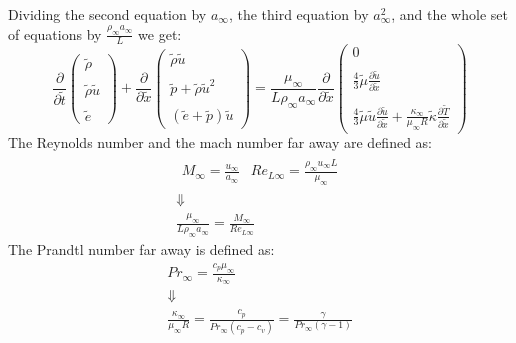 \documentclass[11pt, a4paper]{article}
\newcommand{\parder}[2]{\frac{\partial {#1}}{\partial {#2}}}
\begin{document}
Dividing the second equation by $a_\infty$, the third equation by $a_\infty^2$, and the whole set of equations by $\displaystyle\frac{\rho_\infty a_\infty}{L}$ we get:
\begin{equation}
    \parder{}{\tilde{t}}\begin{pmatrix}
        \tilde{\rho} \\\\
        \tilde{\rho}\tilde{u} \\\\
        \tilde{e}
    \end{pmatrix}+\parder{}{\tilde{x}}\begin{pmatrix}
        \tilde{\rho}\tilde{u} \\\\
        \tilde{p}+\tilde{\rho}\tilde{u}^2 \\\\
        \left(\tilde{e}+\tilde{p}\right)\tilde{u}
    \end{pmatrix}=\frac{\mu_\infty}{L\rho_\infty a_\infty}\parder{}{\tilde{x}}\begin{pmatrix}
        0 \\\\
        \displaystyle\frac{4}{3}\tilde{\mu} \parder{\tilde{u}}{\tilde{x}} \\\\
        \displaystyle\frac{4}{3}\tilde{\mu}\tilde{u}\parder{\tilde{u}}{\tilde{x}}+\frac{\kappa_\infty}{\mu_\infty R}\tilde{\kappa}\parder{\tilde{T}}{\tilde{x}}
    \end{pmatrix}
\end{equation}
The Reynolds number and the mach number far away are defined as:
\begin{equation}
    \begin{array}{c}
        \begin{matrix}
            \displaystyle M_\infty=\frac{u_\infty}{a_\infty} & \displaystyle Re_{L\infty}=\frac{\rho_\infty u_\infty L}{\mu_\infty}
        \end{matrix} \\
        \Downarrow \\
        \displaystyle \frac{\mu_\infty}{L\rho_\infty a_\infty}=\frac{M_\infty}{Re_{L\infty}}
    \end{array}
\end{equation}
The Prandtl number far away is defined as:
\begin{equation}
    \begin{array}{c}
        \displaystyle Pr_\infty=\frac{c_p\mu_\infty}{\kappa_\infty} \\
        \Downarrow \\
        \displaystyle\frac{\kappa_\infty}{\mu_\infty R}=\frac{c_p}{Pr_\infty \left(c_p-c_v\right)}=\frac{\gamma}{Pr_\infty\left(\gamma-1\right)}
    \end{array}
\end{equation}
\end{document}
